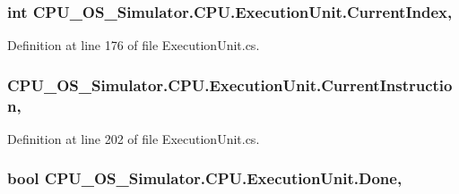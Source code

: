 \subsubsection[{Current\+Index}]{\setlength{\rightskip}{0pt plus 5cm}int C\+P\+U\+\_\+\+O\+S\+\_\+\+Simulator.\+C\+P\+U.\+Execution\+Unit.\+Current\+Index\hspace{0.3cm}{\ttfamily [get]}, {\ttfamily [set]}}\label{class_c_p_u___o_s___simulator_1_1_c_p_u_1_1_execution_unit_a14d2a23bdc679ed2758733f34f79db63}


Definition at line 176 of file Execution\+Unit.\+cs.

\hypertarget{class_c_p_u___o_s___simulator_1_1_c_p_u_1_1_execution_unit_a285d7b487a3ac5eff07c640e438ceb11}{}
\subsubsection[{Current\+Instruction}]{ C\+P\+U\+\_\+\+O\+S\+\_\+\+Simulator.\+C\+P\+U.\+Execution\+Unit.\+Current\+Instruction\hspace{0.3cm}{\ttfamily [get]}, {\ttfamily [set]}}\label{class_c_p_u___o_s___simulator_1_1_c_p_u_1_1_execution_unit_a285d7b487a3ac5eff07c640e438ceb11}


Definition at line 202 of file Execution\+Unit.\+cs.

\hypertarget{class_c_p_u___o_s___simulator_1_1_c_p_u_1_1_execution_unit_afc47977290c9bccf4f3b115613a67576}{}
\subsubsection[{Done}]{\setlength{\rightskip}{0pt plus 5cm}bool C\+P\+U\+\_\+\+O\+S\+\_\+\+Simulator.\+C\+P\+U.\+Execution\+Unit.\+Done\hspace{0.3cm}{\ttfamily [get]}, {\ttfamily [set]}}\label{class_c_p_u___o_s___simulator_1_1_c_p_u_1_1_execution_unit_afc47977290c9bccf4f3b115613a67576}


